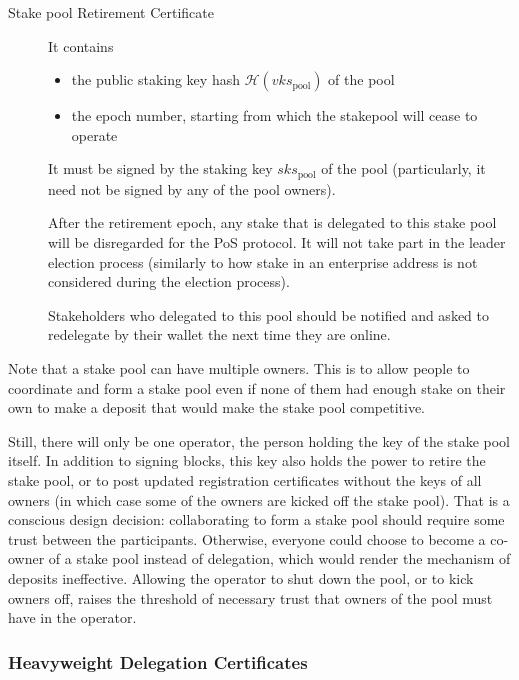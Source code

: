 \documentclass[11pt,a4paper]{article}
\begin{document}
\begin{description}
\item[Stake pool Retirement Certificate]
It contains

\begin{itemize}
\item
  the public staking key hash \(\mathcal{H}(vks_\text{pool})\) of the
  pool
\item
  the epoch number, starting from which the stakepool will cease to
  operate
\end{itemize}

It must be signed by the staking key \(sks_\text{pool}\) of the pool
(particularly, it need not be signed by any of the pool owners).

After the retirement epoch, any stake that is delegated to this stake
pool will be disregarded for the PoS protocol. It will not take part in
the leader election process (similarly to how stake in an enterprise
address is not considered during the election process).

Stakeholders who delegated to this pool should be notified and asked to
redelegate by their wallet the next time they are online.
\end{description}

Note that a stake pool can have multiple owners. This is to allow
people to coordinate and form a stake pool even if none of them had
enough stake on their own to make a deposit that would make the stake
pool competitive.

Still, there will only be one operator, the person holding the key of
the stake pool itself. In addition to signing blocks, this key also
holds the power to retire the stake pool, or to post updated
registration certificates without the keys of all owners (in which
case some of the owners are kicked off the stake pool). That is a
conscious design decision: collaborating to form a stake pool should
require some trust between the participants. Otherwise, everyone could
choose to become a co-owner of a stake pool instead of delegation,
which would render the mechanism of deposits ineffective. Allowing the
operator to shut down the pool, or to kick owners off, raises the
threshold of necessary trust that owners of the pool must have in the
operator.

\subsubsection{Heavyweight Delegation Certificates}
\label{heavyweight-delegation-certificates}
\end{document}

